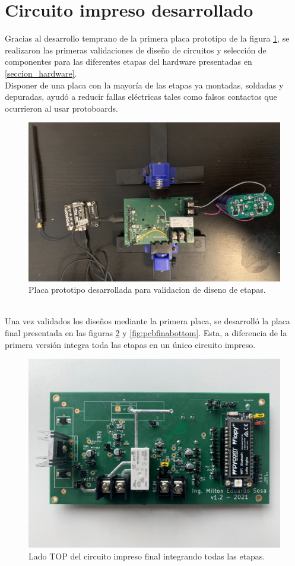 \section{Circuito impreso desarrollado}
\label{sec:pruebasHW}
Gracias al desarrollo temprano de la primera placa prototipo de la figura \ref{fig:placaprototipo}, se realizaron las primeras validaciones de diseño de circuitos y selección de componentes para las diferentes etapas del hardware presentadas en \ref{seccion_hardware}.\\
Disponer de una placa con la mayoría de las etapas ya montadas, soldadas y depuradas, ayudó a reducir fallas eléctricas tales como falsos contactos que ocurrieron al usar protoboards.\\
\begin{figure}[h]
	\centering
	\includegraphics[width=0.9\linewidth]{Figures/placa_prototipo}
	\caption{Placa prototipo desarrollada para validacion de diseno de etapas.}
	\label{fig:placaprototipo}
\end{figure}\\
Una vez validados los diseños mediante la primera placa, se desarrolló la placa final presentada en las figuras \ref{fig:pcbfinaltop} y \ref{fig:pcbfinabottom}. Esta, a diferencia de la primera versi\'{o}n integra toda las etapas en un único circuito impreso.\\
\begin{figure}[h!]
	\centering
	\includegraphics[width=0.8\linewidth]{Figures/pcb_final_TOP}
	\caption{Lado TOP del circuito impreso final integrando todas las etapas.}
	\label{fig:pcbfinaltop}
\end{figure}\\
